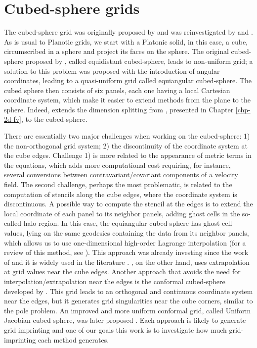 \chapter{Cubed-sphere grids}
\label{chp-cs-grids}

The cubed-sphere grid was originally proposed by \citet{sadourny:1972}
and was reinvestigated by \citet{ronchi:1996} and \citet{rancic:1996}.
As is usual to Planotic grids, we start with a Platonic solid, in this case, a cube,
circumscribed in a sphere and project its faces on the sphere.
The original cubed-sphere proposed by \citet{sadourny:1972}, called equidistant cubed-sphere, leads to non-uniform grid;
a solution to this problem was proposed with the introduction of angular coordinates, leading to a quasi-uniform grid
called equiangular cubed-sphere.
The cubed sphere then consists of six panels, each one having a local Cartesian coordinate system, which 
make it easier to extend methods from the plane to the sphere.
Indeed, \citet{putman:2007} extends the dimension splitting from \citet{lin:1996}, presented in
Chapter \ref{chp-2d-fv}, to the cubed-sphere.

	There are essentially two major challenges when working on the cubed-sphere:
1) the non-orthogonal grid system; 2) the discontinuity of the coordinate system
at the cube edges. Challenge 1) is more related to the appearance of metric terms
in the equations, which adds more computational cost requiring, for instance, several conversions
between contravariant/covariant components of a velocity field.
The second challenge, perhaps the most problematic, is related to the computation
of stencils along the cube edges, where the coordinate system is discontinuous.
A possible way to compute the stencil at the edges is to extend the local coordinate of 
each panel to its neighbor panels, adding ghost cells in the so-called halo region. 
In this case, the equiangular cubed sphere has ghost cell values, 
lying on the same geodesics containing the data from its neighbor panels,
which allows us to use one-dimensional high-order Lagrange interpolation (for a review of this method, see \citet{zerroukat:2022}).
This approach was already investing since the work of \citet{ronchi:1996}
and it is widely used in the literature \citep{Croisille:2013, katta:2015,Katta:2015b,chen:2021}.
\citet{putman:2007}, on the other hand, uses extrapolation
at grid values near the cube edges. Another approach that avoids the need for interpolation/extrapolation
near the edges is the conformal cubed-sphere developed by \citet{rancic:1996}. This grid
leads to an orthogonal and continuous coordinate system near the edges, but it generates grid singularities
near the cube corners, similar to the pole problem. An improved and more uniform conformal grid,
called Uniform Jacobian cubed sphere, was later proposed \citet{rancic:2017}.
Each approach is likely to generate grid imprinting and one of our goals
this work is to investigate how much grid-imprinting each method generates.


